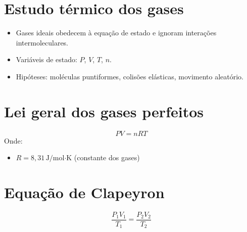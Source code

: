 \documentclass[a4paper,12pt]{article}
\begin{document}
\begin{multicols}{2}
\section{Estudo térmico dos gases}
\begin{itemize}
    \item Gases ideais obedecem à equação de estado e ignoram interações intermoleculares.
    \item Variáveis de estado: $P$, $V$, $T$, $n$.
    \item Hipóteses: moléculas puntiformes, colisões elásticas, movimento aleatório.
\end{itemize}

\section{Lei geral dos gases perfeitos}
\begin{equation}
    PV = nRT
\end{equation}
Onde:
\begin{itemize}
    \item $R = 8{,}31 \, \text{J/mol·K}$ (constante dos gases)
\end{itemize}

\section{Equação de Clapeyron}
\begin{equation}
    \frac{P_1V_1}{T_1} = \frac{P_2V_2}{T_2}
\end{equation}


\end{multicols}
\end{document}
